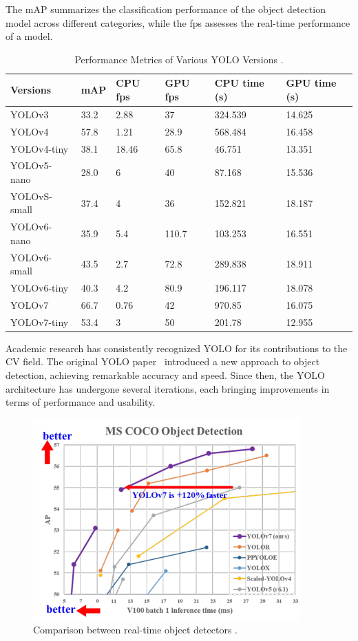 The mAP summarizes the classification performance of the object detection model across different categories, while the fps assesses the real-time performance of a model.

\begin{table}[H]
    \caption[Performance Metrics of Various YOLO Versions]{Performance Metrics of Various YOLO Versions \cite{YOLO_compare}.}
    \label{tab:yolo_performance}
    \centering
    \begin{tabular}{|l|l|l|l|l|l|}
        \hline
        Versions & mAP & CPU fps & GPU fps & CPU time (s) & GPU time (s) \\ \hline
        YOLOv3 & 33.2 & 2.88 & 37 & 324.539 & 14.625 \\
        YOLOv4 & 57.8 & 1.21 & 28.9 & 568.484 & 16.458 \\
        YOLOv4-tiny & 38.1 & 18.46 & 65.8 & 46.751 & 13.351 \\
        YOLOv5-nano & 28.0 & 6 & 40 & 87.168 & 15.536 \\
        YOLOvS-small & 37.4 & 4 & 36 & 152.821 & 18.187 \\
        YOLOv6-nano & 35.9 & 5.4 & 110.7 & 103.253 & 16.551 \\
        YOLOv6-small & 43.5 & 2.7 & 72.8 & 289.838 & 18.911 \\
        YOLOv6-tiny & 40.3 & 4.2 & 80.9 & 196.117 & 18.078 \\
        YOLOv7 & 66.7 & 0.76 & 42 & 970.85 & 16.075 \\
        YOLOv7-tiny & 53.4 & 3 & 50 & 201.78 & 12.955 \\ \hline
    \end{tabular}
\end{table}


Academic research has consistently recognized YOLO for its contributions to the CV field.
The original YOLO paper~\cite{YOLO} introduced a new approach to object detection, achieving remarkable accuracy and speed.
Since then, the YOLO architecture has undergone several iterations, each bringing improvements in terms of performance and usability.

\begin{figure}[H]
    \centering
    \includegraphics[width=0.6\linewidth]{figures/yolov7}
    \caption[Comparison between real-time object detectors]{Comparison between real-time object detectors \cite{yolov7}.}
    \label{fig:yolov7}
\end{figure}


